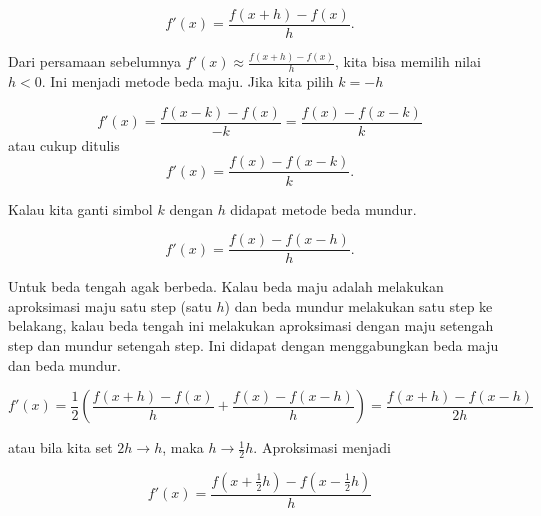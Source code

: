 \[ f'(x) = \frac{f(x+h) - f(x)}{h}.\]

    Dari persamaan sebelumnya \(f'(x) \approx \frac{f(x+h) - f(x)}{h}\),
kita bisa memilih nilai \(h<0\). Ini menjadi metode beda maju. Jika kita
pilih \(k = -h\)

\[ f'(x) = \frac{f(x - k) - f(x)}{-k} = \frac{f(x) - f(x-k)}{k}\] atau
cukup ditulis \[ f'(x) = \frac{f(x) - f(x-k)}{k}.\]

    Kalau kita ganti simbol \(k\) dengan \(h\) didapat metode beda mundur.

\[ f'(x) = \frac{f(x) - f(x-h)}{h}.\]

    Untuk beda tengah agak berbeda. Kalau beda maju adalah melakukan
aproksimasi maju satu step (satu \(h\)) dan beda mundur melakukan satu
step ke belakang, kalau beda tengah ini melakukan aproksimasi dengan
maju setengah step dan mundur setengah step. Ini didapat dengan
menggabungkan beda maju dan beda mundur.

\[ f'(x) = \frac12 \left(  \frac{f(x+h) - f(x)}{h} +  \frac{f(x) - f(x-h)}{h} \right) = \frac{f(x+h) - f(x-h)}{2h} \]

    atau bila kita set \(2h \to h\), maka \(h \to \frac12 h\). Aproksimasi
menjadi

\[ f'(x) =   \frac{f(x + \frac12 h) - f(x- \frac 12 h)}{h} \]

